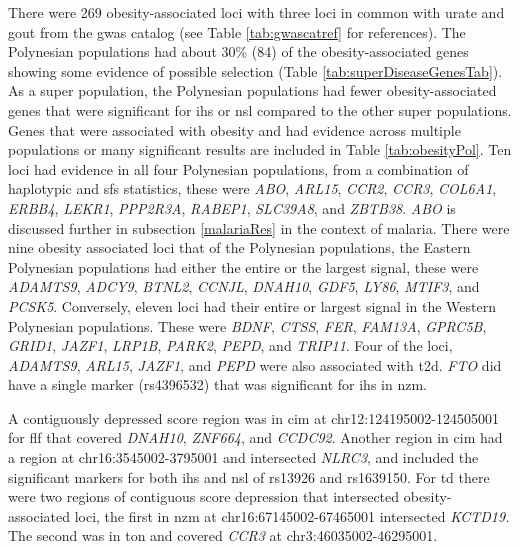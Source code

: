 \documentclass[]{report}
\begin{document}
There were 269 obesity-associated loci with three loci in common with
urate and gout from the \gls{gwas} catalog (see Table
\ref{tab:gwascatref} for references). The Polynesian populations had
about 30\% (84) of the obesity-associated genes showing some evidence of
possible selection (Table \ref{tab:superDiseaseGenesTab}). As a super
population, the Polynesian populations had fewer obesity-associated
genes that were significant for \gls{ihs} or \gls{nsl} compared to the
other super populations. Genes that were associated with obesity and had
evidence across multiple populations or many significant results are
included in Table \ref{tab:obesityPol}. Ten loci had evidence in all
four Polynesian populations, from a combination of haplotypic and
\gls{sfs} statistics, these were \emph{ABO}, \emph{ARL15}, \emph{CCR2},
\emph{CCR3}, \emph{COL6A1}, \emph{ERBB4}, \emph{LEKR1}, \emph{PPP2R3A},
\emph{RABEP1}, \emph{SLC39A8}, and \emph{ZBTB38}. \emph{ABO} is
discussed further in subsection \ref{malariaRes} in the context of
malaria. There were nine obesity associated loci that of the Polynesian
populations, the Eastern Polynesian populations had either the entire or
the largest signal, these were \emph{ADAMTS9}, \emph{ADCY9},
\emph{BTNL2}, \emph{CCNJL}, \emph{DNAH10}, \emph{GDF5}, \emph{LY86},
\emph{MTIF3}, and \emph{PCSK5}. Conversely, eleven loci had their entire
or largest signal in the Western Polynesian populations. These were
\emph{BDNF}, \emph{CTSS}, \emph{FER}, \emph{FAM13A}, \emph{GPRC5B},
\emph{GRID1}, \emph{JAZF1}, \emph{LRP1B}, \emph{PARK2}, \emph{PEPD}, and
\emph{TRIP11}. Four of the loci, \emph{ADAMTS9}, \emph{ARL15},
\emph{JAZF1}, and \emph{PEPD} were also associated with \gls{t2d}.
\emph{FTO} did have a single marker (rs4396532) that was significant for
\gls{ihs} in \gls{nzm}.

A contiguously depressed score region was in \gls{cim} at
chr12:124195002-124505001 for \gls{flf} that covered \emph{DNAH10},
\emph{ZNF664}, and \emph{CCDC92}. Another region in \gls{cim} had a
region at chr16:3545002-3795001 and intersected \emph{NLRC3}, and
included the significant markers for both \gls{ihs} and \gls{nsl} of
rs13926 and rs1639150. For \gls{td} there were two regions of contiguous
score depression that intersected obesity-associated loci, the first in
\gls{nzm} at chr16:67145002-67465001 intersected \emph{KCTD19.} The
second was in \gls{ton} and covered \emph{CCR3} at
chr3:46035002-46295001.

\begingroup\fontsize{6}{8}\selectfont
\end{document}
